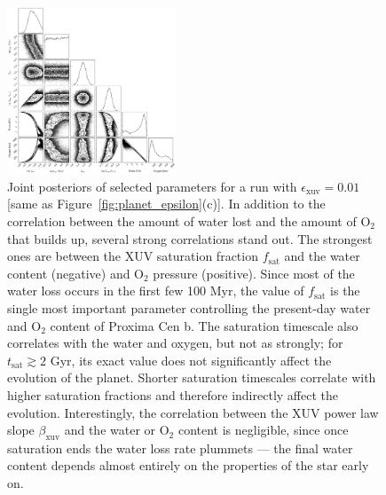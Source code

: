 \documentclass[]{emulateapj}
\begin{document}
\begin{figure}[hbt]
  \begin{center}
      \includegraphics[width=0.45\textwidth]{figures/corner.pdf}
       \caption{Joint posteriors of selected parameters for a run with $\epsilon_\mathrm{xuv} = 0.01$ [same as
        Figure~\ref{fig:planet_epsilon}(c)]. In addition to the correlation between the amount of water
        lost and the amount of O$_2$ that builds up, several strong correlations stand out.
        The strongest ones are between the XUV saturation fraction $f_\mathrm{sat}$ and
        the water content (negative) and O$_2$ pressure (positive). Since most of the water loss occurs 
        in the first few 100 Myr, the value of $f_\mathrm{sat}$ is the single most important parameter
        controlling the present-day water and O$_2$ content of Proxima Cen b. The saturation timescale
        also correlates with the water and oxygen, but not as strongly; for $t_\mathrm{sat} \gtrsim 2$ Gyr,
        its exact value does not significantly affect the evolution of the planet. Shorter saturation
        timescales correlate with higher saturation fractions and therefore indirectly affect the evolution. 
        Interestingly, the correlation between the XUV power law slope $\beta_\mathrm{xuv}$ and the water or
        O$_2$ content is negligible, since once saturation ends the water loss rate plummets --- the final
        water content depends almost entirely on the properties of the star early on.}
     \label{fig:corner}
  \end{center}
\end{figure}
\end{document}
